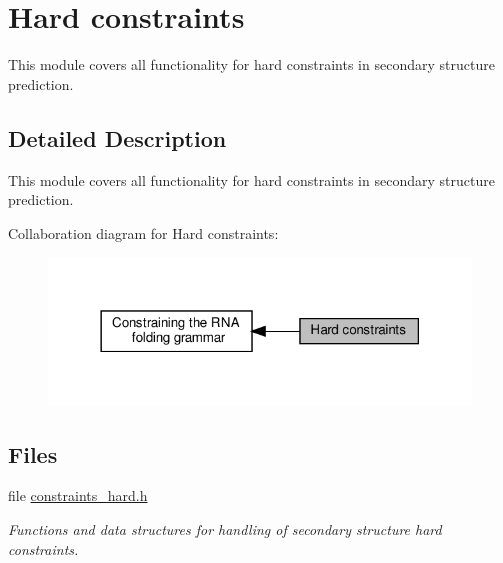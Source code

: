 \hypertarget{group__hard__constraints}{}\section{Hard constraints}
\label{group__hard__constraints}


This module covers all functionality for hard constraints in secondary structure prediction.  




\subsection{Detailed Description}
This module covers all functionality for hard constraints in secondary structure prediction. 

Collaboration diagram for Hard constraints\+:
\nopagebreak
\begin{figure}[H]
\begin{center}
\leavevmode
\includegraphics[width=318pt]{group__hard__constraints}
\end{center}
\end{figure}
\subsection*{Files}
\begin{DoxyCompactItemize}
\item 
file \hyperlink{constraints__hard_8h}{constraints\+\_\+hard.\+h}
\begin{DoxyCompactList}\small\item\em Functions and data structures for handling of secondary structure hard constraints. \end{DoxyCompactList}\end{DoxyCompactItemize}
